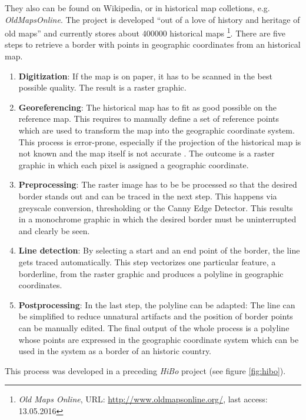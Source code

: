 They also can be found on Wikipedia, or in historical map colletions, e.g. \emph{OldMapsOnline}. The project is developed ``out of a love of history and heritage of old maps'' and currently stores about 400000 historical maps
\footnote{
  \textit{Old Maps Online},
  URL: \url{http://www.oldmapsonline.org/},
  last access: 13.05.2016
}.
There are five steps to retrieve a border with points in geographic coordinates from an historical map.
\begin{enumerate}
  \item \textbf{Digitization}: If the map is on paper, it has to be scanned in the best possible quality. The result is a raster graphic.
  \item \textbf{Georeferencing}: The historical map has to fit as good possible on the reference map. This requires to manually define a set of reference points which are used to transform the map into the geographic coordinate system. This process is error-prone, especially if the projection of the historical map is not known and the map itself is not accurate
  \cite[pp. xvii]{knowles2002past}.
  The outcome is a raster graphic in which each pixel is assigned a geographic coordinate.
  \item \textbf{Preprocessing}: The raster image has to be be processed so that the desired border stands out and can be traced in the next step. This happens via greyscale conversion, thresholding or the Canny Edge Detector. This results in a monochrome graphic in which the desired border must be uninterrupted and clearly be seen.
  \item \textbf{Line detection}: By selecting a start and an end point of the border, the line gets traced automatically. This step vectorizes one particular feature, a borderline, from the raster graphic and produces a polyline in geographic coordinates.
  \item \textbf{Postprocessing}: In the last step, the polyline can be adapted: The line can be simplified to reduce unnatural artifacts and the position of border points can be manually edited. The final output of the whole process is a polyline whose points are expressed in the geographic coordinate system which can be used in the system as a border of an historic country.
\end{enumerate}

This process was developed in a preceding \emph{HiBo} project
(see figure \ref{fig:hibo}).

